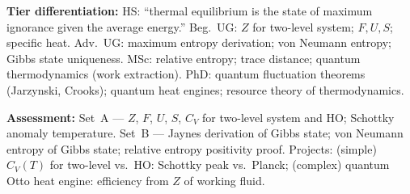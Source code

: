 \documentclass[11pt,a4paper]{article}
\begin{document}
\begin{tcolorbox}[modulebox, title={Module~II.7 --- Lecture L01: Density Operators in Thermodynamics}]
\medskip\textbf{Tier differentiation:}
HS: ``thermal equilibrium is the state of maximum ignorance given the average energy.''
Beg.\ UG: $Z$ for two-level system; $F,U,S$; specific heat.
Adv.\ UG: maximum entropy derivation; von Neumann entropy; Gibbs state uniqueness.
MSc: relative entropy; trace distance; quantum thermodynamics (work extraction).
PhD: quantum fluctuation theorems (Jarzynski, Crooks); quantum heat engines; resource theory of thermodynamics.

\medskip\textbf{Assessment:}
Set~A --- $Z$, $F$, $U$, $S$, $C_V$ for two-level system and HO; Schottky anomaly temperature.
Set~B --- Jaynes derivation of Gibbs state; von Neumann entropy of Gibbs state; relative entropy positivity proof.
Projects: (simple) $C_V(T)$ for two-level vs.\ HO: Schottky peak vs.\ Planck;
(complex) quantum Otto heat engine: efficiency from $Z$ of working fluid.
\end{tcolorbox}

\medskip
\end{document}
